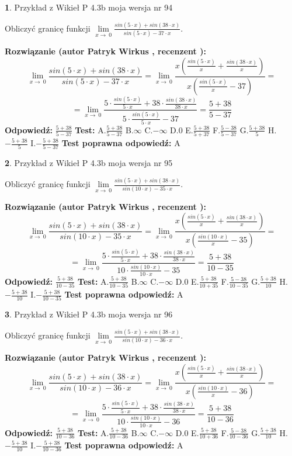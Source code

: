 \documentclass[12pt, a4paper]{article}
\theoremstyle{definition} %
\newtheorem{zad}{}
\newcommand{\zadStart}[1]{\begin{zad}#1\newline}
\newcommand{\zadStop}{\end{zad}}
\newcommand{\rozwStart}[2]{\noindent \textbf{Rozwiązanie (autor #1 , recenzent #2): }\newline}
\newcommand{\rozwStop}{\newline}
\newcommand{\odpStart}{\noindent \textbf{Odpowiedź:}\newline}
\newcommand{\odpStop}{\newline}
\newcommand{\testStart}{\noindent \textbf{Test:}\newline}
\newcommand{\testStop}{\newline}
\newcommand{\kluczStart}{\noindent \textbf{Test poprawna odpowiedź:}\newline}
\newcommand{\kluczStop}{\newline}
\begin{document}
\zadStart{Przykład z Wikieł P 4.3b moja wersja nr 94}


Obliczyć granicę funkcji $\lim\limits_{x\to\ 0}\frac{sin(5 \cdot x)+sin(38 \cdot x)}{sin(5 \cdot x)-37 \cdot x}$.
\zadStop
\rozwStart{Patryk Wirkus}{}
$$\lim\limits_{x\to\ 0}\frac{sin(5 \cdot x)+sin(38 \cdot x)}{sin(5 \cdot x)-37 \cdot x}=\lim\limits_{x\to\ 0}\frac{x(\frac{sin(5 \cdot x)}{x}+\frac{sin(38 \cdot x)}{x})}{x(\frac{sin(5 \cdot x)}{x}-37)}=$$
$$=\lim\limits_{x\to\ 0}\frac{5 \cdot \frac{sin(5 \cdot x)}{5 \cdot x}+38 \cdot \frac{sin(38 \cdot x)}{38 \cdot x}}{5 \cdot \frac{sin(5 \cdot x)}{5 \cdot x}-37}=\frac{5+38}{5-37}$$
\rozwStop
\odpStart
$\frac{5+38}{5-37}$
\odpStop
\testStart
A.$\frac{5+38}{5-37}$
B.$\infty$
C.$-\infty$
D.$0$
E.$\frac{5+38}{5+37}$
F.$\frac{5-38}{5-37}$
G.$\frac{5+38}{5}$
H.$-\frac{5+38}{5}$
I.$-\frac{5+38}{5-37}$
\testStop
\kluczStart
A
\kluczStop



\zadStart{Przykład z Wikieł P 4.3b moja wersja nr 95}


Obliczyć granicę funkcji $\lim\limits_{x\to\ 0}\frac{sin(5 \cdot x)+sin(38 \cdot x)}{sin(10 \cdot x)-35 \cdot x}$.
\zadStop
\rozwStart{Patryk Wirkus}{}
$$\lim\limits_{x\to\ 0}\frac{sin(5 \cdot x)+sin(38 \cdot x)}{sin(10 \cdot x)-35 \cdot x}=\lim\limits_{x\to\ 0}\frac{x(\frac{sin(5 \cdot x)}{x}+\frac{sin(38 \cdot x)}{x})}{x(\frac{sin(10 \cdot x)}{x}-35)}=$$
$$=\lim\limits_{x\to\ 0}\frac{5 \cdot \frac{sin(5 \cdot x)}{5 \cdot x}+38 \cdot \frac{sin(38 \cdot x)}{38 \cdot x}}{10 \cdot \frac{sin(10 \cdot x)}{10 \cdot x}-35}=\frac{5+38}{10-35}$$
\rozwStop
\odpStart
$\frac{5+38}{10-35}$
\odpStop
\testStart
A.$\frac{5+38}{10-35}$
B.$\infty$
C.$-\infty$
D.$0$
E.$\frac{5+38}{10+35}$
F.$\frac{5-38}{10-35}$
G.$\frac{5+38}{10}$
H.$-\frac{5+38}{10}$
I.$-\frac{5+38}{10-35}$
\testStop
\kluczStart
A
\kluczStop



\zadStart{Przykład z Wikieł P 4.3b moja wersja nr 96}


Obliczyć granicę funkcji $\lim\limits_{x\to\ 0}\frac{sin(5 \cdot x)+sin(38 \cdot x)}{sin(10 \cdot x)-36 \cdot x}$.
\zadStop
\rozwStart{Patryk Wirkus}{}
$$\lim\limits_{x\to\ 0}\frac{sin(5 \cdot x)+sin(38 \cdot x)}{sin(10 \cdot x)-36 \cdot x}=\lim\limits_{x\to\ 0}\frac{x(\frac{sin(5 \cdot x)}{x}+\frac{sin(38 \cdot x)}{x})}{x(\frac{sin(10 \cdot x)}{x}-36)}=$$
$$=\lim\limits_{x\to\ 0}\frac{5 \cdot \frac{sin(5 \cdot x)}{5 \cdot x}+38 \cdot \frac{sin(38 \cdot x)}{38 \cdot x}}{10 \cdot \frac{sin(10 \cdot x)}{10 \cdot x}-36}=\frac{5+38}{10-36}$$
\rozwStop
\odpStart
$\frac{5+38}{10-36}$
\odpStop
\testStart
A.$\frac{5+38}{10-36}$
B.$\infty$
C.$-\infty$
D.$0$
E.$\frac{5+38}{10+36}$
F.$\frac{5-38}{10-36}$
G.$\frac{5+38}{10}$
H.$-\frac{5+38}{10}$
I.$-\frac{5+38}{10-36}$
\testStop
\kluczStart
A
\kluczStop
\end{document}
